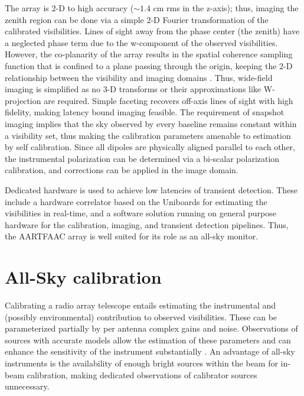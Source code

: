 \documentclass[referee]{aa}
\begin{document}
The  array is  2-D to  high accuracy  ($\sim$$1.4$ cm  rms in  the  z-axis); thus,
imaging  the  zenith  region  can  be  done  via  a  simple  \mbox{2-D}  Fourier
transformation of  the calibrated  visibilities.  Lines of  sight away  from the
phase center (the zenith) have a  neglected phase term due to the w-component of
the observed  visibilities.  However, the  co-planarity of the array  results in
the  spatial coherence sampling  function that  is confined  to a  plane passing
through  the origin,  keeping the  2-D relationship  between the  visibility and
imaging   domains  \citep{cornwell1992radio}.    Thus,  wide-field   imaging  is
simplified  as  no 3-D  transforms  or  their  approximations like  W-projection
\citep{cornwell2008noncoplanar} are required.  Simple faceting recovers off-axis
lines of  sight with high fidelity,  making latency bound  imaging feasible. The
requirement of snapshot imaging implies  that the sky observed by every baseline
remains constant within a visibility set, thus making the calibration parameters
amenable to  estimation by self  calibration.  Since all dipoles  are physically
aligned parallel to each other,  the instrumental polarization can be determined
via a bi-scalar polarization calibration,  and corrections can be applied in the
image domain.

Dedicated  hardware is  used to  achieve low  latencies of  transient detection.
These include  a hardware correlator based  on the Uniboards  for estimating the
visibilities in  real-time, and a  software solution running on  general purpose
hardware for  the calibration, imaging, and transient  detection pipelines. Thus,
the AARTFAAC array is well suited for its role as an all-sky monitor.

\section{\label{sec:Array-calibration-for}All-Sky calibration}
Calibrating  a radio  array telescope  entails estimating  the  instrumental and
(possibly environmental)  contribution to  observed visibilities.  These  can be
parameterized partially by per antenna  complex gains and noise. Observations of
sources with accurate  models allow the estimation of  these parameters and can
enhance     the     sensitivity      of     the     instrument     substantially
\citep{taylor1999synthesis}.   An  advantage   of  all-sky  instruments  is  the
availability of enough  bright sources within the beam  for in-beam calibration,
making dedicated observations of calibrator sources unnecessary.
\end{document}
